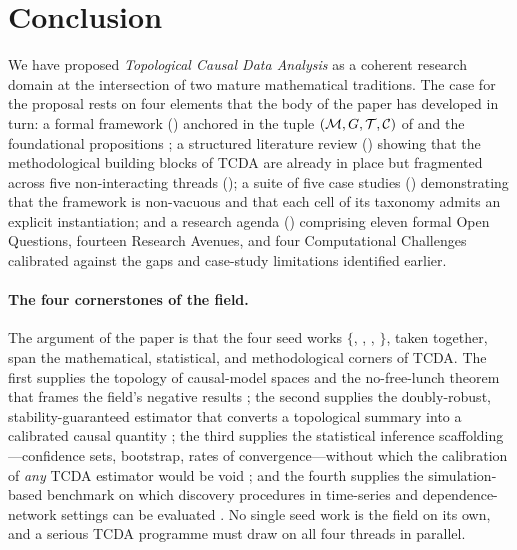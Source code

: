 \section{Conclusion}\label{sec:conclusion}

We have proposed \emph{Topological Causal Data Analysis} as a
coherent research domain at the intersection of two mature
mathematical traditions. The case for the proposal rests on four
elements that the body of the paper has developed in turn: a formal
framework () anchored in the tuple
$(\mathcal{M}, G, \mathcal{T}, \mathcal{C})$ of  and the foundational
propositions ; a
structured literature review () showing that the
methodological building blocks of TCDA are already in place but
fragmented across five non-interacting threads
(); a suite of five case studies
() demonstrating that the framework is
non-vacuous and that each cell of its taxonomy admits an explicit
instantiation; and a research agenda () comprising
eleven formal Open Questions, fourteen Research Avenues, and four
Computational Challenges calibrated against the gaps and case-study
limitations identified earlier.

\paragraph{The four cornerstones of the field.}
The argument of the paper is that the four seed works
$\{$\citet{ibeling2021topological}, \citet{kim2026topological},
\citet{lecci2014statistical},
\citet{elyaagoubi2023statistical}$\}$, taken together, span the
mathematical, statistical, and methodological corners of TCDA. The
first supplies the topology of causal-model spaces and the
no-free-lunch theorem that frames the field's negative results
\citep{ibeling2021topological}; the second supplies the
doubly-robust, stability-guaranteed estimator that converts a
topological summary into a calibrated causal quantity
\citep{kim2026topological}; the third supplies the statistical
inference scaffolding---confidence sets, bootstrap, rates of
convergence---without which the calibration of \emph{any} TCDA
estimator would be void \citep{lecci2014statistical}; and the fourth
supplies the simulation-based benchmark on which discovery procedures
in time-series and dependence-network settings can be evaluated
\citep{elyaagoubi2023statistical}. No single seed work is the field
on its own, and a serious TCDA programme must draw on all four
threads in parallel.

